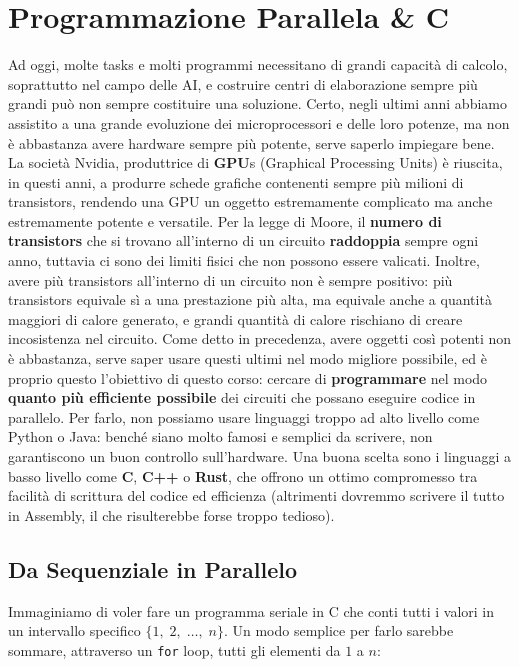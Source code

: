 \chapter{Programmazione Parallela \texorpdfstring{\&}{&} C}

Ad oggi, molte tasks e molti programmi necessitano di grandi capacità di calcolo, soprattutto nel campo delle AI, e costruire centri di elaborazione sempre più grandi può non sempre costituire una soluzione. Certo, negli ultimi anni abbiamo assistito a una grande evoluzione dei microprocessori e delle loro potenze, ma non è abbastanza avere hardware sempre più potente, serve saperlo impiegare bene.
\nwl
La società Nvidia, produttrice di \textbf{GPU}s (Graphical Processing Units) è riuscita, in questi anni, a produrre schede grafiche contenenti sempre più milioni di transistors, rendendo una GPU un oggetto estremamente complicato ma anche estremamente potente e versatile. Per la legge di Moore, il \textbf{numero di transistors} che si trovano all'interno di un circuito \textbf{raddoppia} sempre ogni anno, tuttavia ci sono dei limiti fisici che non possono essere valicati. Inoltre, avere più transistors all'interno di un circuito non è sempre positivo: più transistors equivale sì a una prestazione più alta, ma equivale anche a quantità maggiori di calore generato, e grandi quantità di calore rischiano di creare incosistenza nel circuito.
\nwl
Come detto in precedenza, avere oggetti così potenti non è abbastanza, serve saper usare questi ultimi nel modo migliore possibile, ed è proprio questo l'obiettivo di questo corso: cercare di \textbf{programmare} nel modo \textbf{quanto più efficiente possibile} dei circuiti che possano eseguire codice in parallelo.
\nwl
Per farlo, non possiamo usare linguaggi troppo ad alto livello come Python o Java: benché siano molto famosi e semplici da scrivere, non garantiscono un buon controllo sull'hardware. Una buona scelta sono i linguaggi a basso livello come \textbf{C}, \textbf{C++} o \textbf{Rust}, che offrono un ottimo compromesso tra facilità di scrittura del codice ed efficienza (altrimenti dovremmo scrivere il tutto in Assembly, il che risulterebbe forse troppo tedioso).

\section{Da Sequenziale in Parallelo}

Immaginiamo di voler fare un programma seriale in C che conti tutti i valori in un intervallo specifico $\{ 1, \; 2, \; \dots, \; n\}$. Un modo semplice per farlo sarebbe sommare, attraverso un \verb|for| loop, tutti gli elementi da $1$ a $n$:

